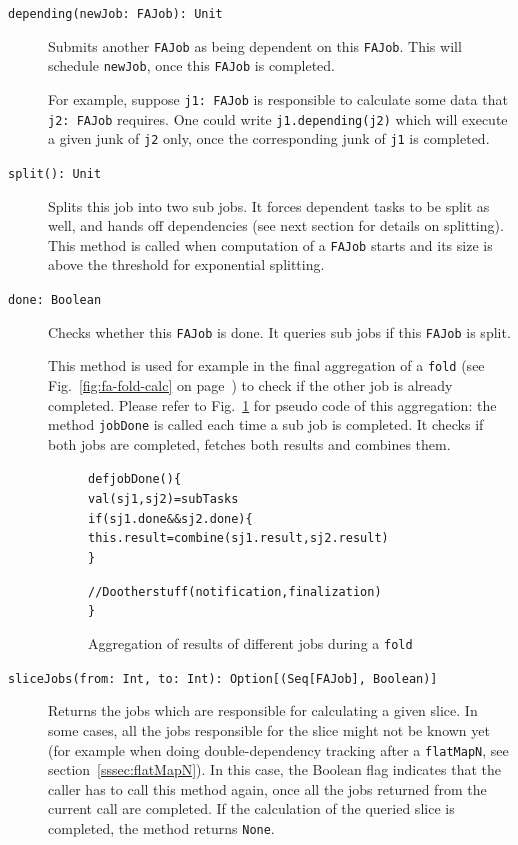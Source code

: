 \documentclass[runningheads,a4paper,fleqn]{llncs}
\begin{document}
\begin{description}
  \item[\texttt{depending(newJob: FAJob): Unit}] Submits another \texttt{FAJob} as being
    dependent on this \texttt{FAJob}. This will schedule
    \texttt{newJob}, once this \texttt{FAJob} is completed.

    For example, suppose \texttt{j1: FAJob} is responsible to
    calculate some data that \texttt{j2: FAJob} requires. One
    could write \verb|j1.depending(j2)| which will execute a given
    junk of \texttt{j2} only, once the corresponding junk of
    \texttt{j1} is completed.
  \item[\texttt{split(): Unit}] Splits this job into two
    sub jobs. It forces dependent tasks to be split as well, and hands off
    dependencies (see next section for details on splitting). This
    method is called when computation of a \texttt{FAJob} starts and
    its size is above the threshold for exponential splitting.
  \item[\texttt{done: Boolean}] Checks whether this \texttt{FAJob} is
    done. It queries sub jobs if this \texttt{FAJob} is split.

    This method is used for example in the final aggregation of a 
    \texttt{fold} (see Fig.~\ref{fig:fa-fold-calc} on
    page~\pageref{fig:fa-fold-calc}) to check if the other job is
    already completed. Please refer to Fig.~\ref{fig:fa-fold-code} for
    pseudo code of this aggregation: the method \texttt{jobDone} is
    called each time a sub job is completed. It checks if both jobs
    are completed, fetches both results and combines them.

\begin{figure}    
\begin{alltt}
{\scriptsize
def jobDone() \{
  val (sj1, sj2) = subTasks
  if (sj1.done && sj2.done) \{
    this.result = combine(sj1.result, sj2.result)
  \}
  
  // Do other stuff (notification, finalization)
\}
}
\end{alltt}
\caption{Aggregation of results of different jobs during a
  \texttt{fold}}
\label{fig:fa-fold-code}
\end{figure}

  \item[\texttt{sliceJobs(from: Int, to: Int): Option[(Seq[FAJob],
      Boolean)]}] Returns the jobs which are responsible for
    calculating a given slice. In some cases, all the jobs responsible 
    for the slice might not be known yet (for example when doing
    double-dependency tracking after a \texttt{flatMapN}, see
    section~\ref{sssec:flatMapN}). In this case, the Boolean flag
    indicates that the caller has to call this method again, once all
    the jobs returned from the current call are completed. If the
    calculation of the queried slice is completed, the method returns
    \texttt{None}.


\end{description}
\end{document}
